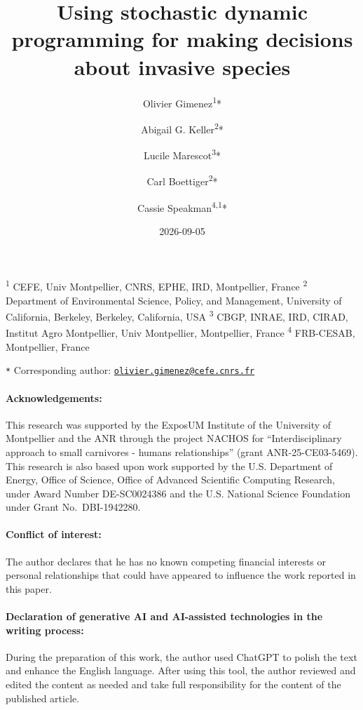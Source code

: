\documentclass[
  11pt,
  a4paper,
]{article}
\title{Using stochastic dynamic programming for making decisions about invasive species}
\author{Olivier Gimenez\textsuperscript{1}* \and Abigail G. Keller\textsuperscript{2}* \and Lucile Marescot\textsuperscript{3}* \and Carl Boettiger\textsuperscript{2}* \and Cassie Speakman\textsuperscript{4,1}*}
\date{2026-09-05}
\begin{document}
\maketitle

\linenumbers

\small

\textsuperscript{1} CEFE, Univ Montpellier, CNRS, EPHE, IRD, Montpellier, France
\textsuperscript{2} Department of Environmental Science, Policy, and Management, University of California, Berkeley, Berkeley, California, USA
\textsuperscript{3} CBGP, INRAE, IRD, CIRAD, Institut Agro Montpellier, Univ Montpellier, Montpellier, France
\textsuperscript{4} FRB-CESAB, Montpellier, France

\texttt{*} Corresponding author: \href{mailto:olivier.gimenez@cefe.cnrs.fr}{\nolinkurl{olivier.gimenez@cefe.cnrs.fr}}

\normalsize

\paragraph{Acknowledgements:}

This research was supported by the ExposUM Institute of the University of Montpellier and the ANR through the project NACHOS for ``Interdisciplinary approach to small carnivores - humans relationships'' (grant ANR-25-CE03-5469). This research is also based upon work supported by the U.S. Department of Energy, Office of Science, Office of Advanced Scientific Computing Research, under Award Number DE-SC0024386 and the U.S. National Science Foundation under Grant No.~DBI-1942280.

\paragraph{Conflict of interest:}

The author declares that he has no known competing financial interests or personal relationships that could have appeared to influence the work reported in this paper.

\paragraph{Declaration of generative AI and AI-assisted technologies in the writing process:}

During the preparation of this work, the author used ChatGPT to polish the text and enhance the English language. After using this tool, the author reviewed and edited the content as needed and take full responsibility for the content of the published article.
\end{document}
